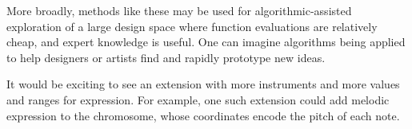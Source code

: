 \documentclass[conference]{IEEEtran}
\begin{document}
More broadly, methods like these may be used for algorithmic-assisted
exploration of a large design space where function evaluations are relatively
cheap, and expert knowledge is useful. One can imagine algorithms being applied
to help designers or artists find and rapidly prototype new ideas.

It would be exciting to see an extension with more instruments and more values
and ranges for expression. For example, one such extension could add melodic
expression to the chromosome, whose coordinates encode the pitch of each note.







\end{document}
